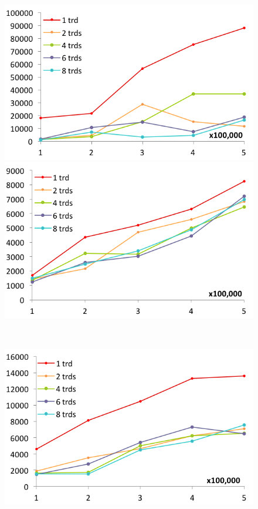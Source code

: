 \begin{figure}[htbp]
  \centering
  \begin{minipage}{.45\textwidth}
    \includegraphics[width=\textwidth]{experimentalResults/1-Finance-simple}
  \end{minipage}
  \begin{minipage}{.45\textwidth}
    \includegraphics[width=\textwidth]{experimentalResults/2-molecule-simple}
  \end{minipage}\\
  \begin{minipage}{.45\textwidth}
    \includegraphics[width=\textwidth]{experimentalResults/3-NIF_GrossAnatomy-simple}

\end{minipage}
\end{figure}

